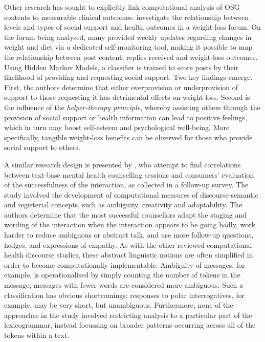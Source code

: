 Other research has sought to explicitly link computational analysis of \gls{OSG} contents to measurable clinical outcomes. \textcite{yan2015good} investigate the relationship between levels and types of social support and health outcomes in a weight\hyp{}loss \gls{forum}. On the \gls{forum} being analysed, many  provided weekly updates regarding changes in weight and diet via a dedicated self\hyp{}monitoring tool, making it possible to map the relationship between \gls{post} content, replies received and weight\hyp{}loss outcomes. Using Hidden Markov Models, a classifier is trained to score \glspl{post} by their likelihood of providing and requesting social support. Two key findings emerge. First, the authors determine that either overprovision or underprovision of support to those requesting it has detrimental effects on weight\hyp{}loss. Second is the influence of the \emph{helper\hyp{}therapy principle}, whereby assisting others through the provision of social support or health information can lead to positive feelings, which in turn may boost self\hyp{}esteem and psychological well\hyp{}being. More specifically, tangible weight\hyp{}loss benefits can be observed for those who provide social support to others.

A similar research design is presented by \textcite{althoff_counseling_2016}, who attempt to find correlations between text\hyp{}base mental health counselling sessions and consumers' evaluation of the successfulness of the interaction, as collected in a follow\hyp{}up survey. The study involved the development of computational measures of discourse-semantic and registerial concepts, such as ambiguity, creativity and adaptability. The authors determine that the most successful counsellors adapt the staging and wording of the interaction when the interaction appears to be going badly, work harder to reduce ambiguous or abstract talk, and use more follow-up questions, hedges, and expressions of empathy. As with the other reviewed computational health discourse studies, these abstract linguistic notions are often simplified in order to become computationally implementable. Ambiguity of messages, for example, is operationalised by simply counting the number of tokens in the message; messages with fewer words are considered more ambiguous. Such a classification has obvious shortcomings: responses to polar interrogatives, for example, may be very short, but unambiguous. Furthermore, none of the approaches in the study involved restricting analysis to a particular part of the lexicogrammar, instead focussing on broader patterns occurring across all of the tokens within a text.

